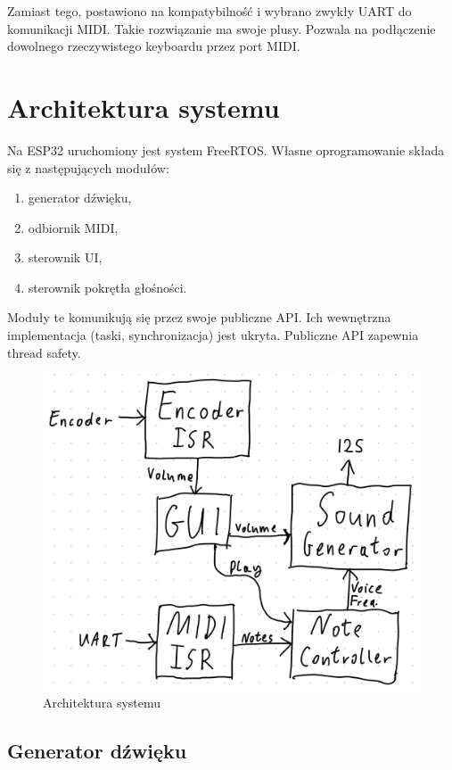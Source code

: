 \documentclass[12pt,a4paper,openright,dvipsnames]{mwart}
\begin{document}
Zamiast tego, postawiono na kompatybilność i wybrano zwykły
UART do komunikacji MIDI.
Takie rozwiązanie ma swoje plusy.
Pozwala na podłączenie dowolnego rzeczywistego
keyboardu przez port MIDI.


\section{Architektura systemu}

Na ESP32 uruchomiony jest system FreeRTOS.
Własne oprogramowanie składa się z następujących modułów:
\begin{enumerate}
    \item generator dźwięku,
    \item odbiornik MIDI,
    \item sterownik UI,
    \item sterownik pokrętła głośności.
\end{enumerate}

Moduły te komunikują się przez swoje publiczne API.
Ich wewnętrzna implementacja (taski, synchronizacja)
jest ukryta. Publiczne API zapewnia thread safety.

\begin{figure}[h]
    \centering
    \includegraphics[width=\textwidth]{rtos}
    \caption{Architektura systemu}
\end{figure}


\subsection{Generator dźwięku}
\end{document}
